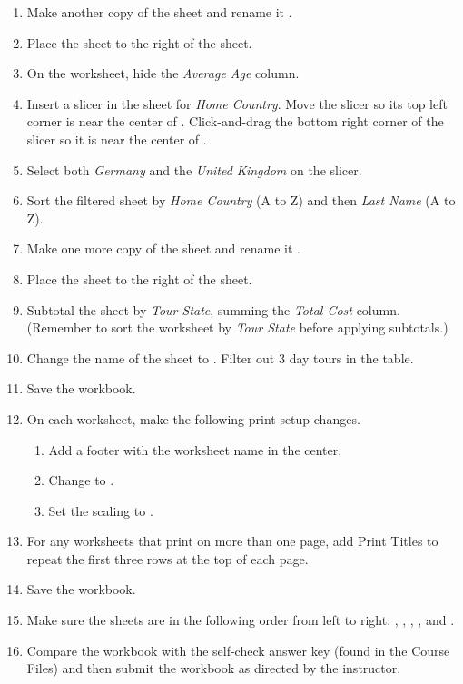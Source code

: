 \begin{enumerate}
	\item Make another copy of the  sheet and rename it . 
	\item Place the  sheet to the right of the  sheet. 
	\item On the  worksheet, hide the \textit{Average Age} column.
	\item Insert a slicer in the  sheet for \textit{Home Country}. Move the slicer so its top left corner is near the center of . Click-and-drag the bottom right corner of the slicer so it is near the center of .
	\item Select both \textit{Germany} and the \textit{United Kingdom} on the slicer.
	\item Sort the filtered sheet by \textit{Home Country} (A to Z) and then \textit{Last Name} (A to Z).

	\item Make one more copy of the  sheet and rename it .
	\item Place the  sheet to the right of the  sheet. 
	\item Subtotal the sheet by \textit{Tour State}, summing the \textit{Total Cost} column. (Remember to sort the worksheet by \textit{Tour State} before applying subtotals.)
	\item Change the name of the  sheet to . Filter out $ 3 $ day tours in the table.

	\item Save the workbook.
	\item On each worksheet, make the following print setup changes.

	\begin{enumerate}
		\item Add a footer with the worksheet name in the center.
		\item Change to .
		\item Set the scaling to .
	\end{enumerate}

	\item For any worksheets that print on more than one page, add Print Titles to repeat the first three rows at the top of each page.
	\item Save the  workbook.
	\item Make sure the sheets are in the following order from left to right: , , , , and .
	\item Compare the workbook with the self-check answer key (found in the Course Files) and then submit the  workbook as directed by the instructor.

\end{enumerate}

